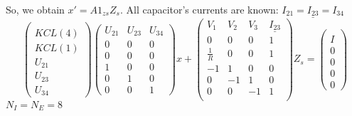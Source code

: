  So, we obtain $x'=A1_{zs}Z_{s}$. All capacitor's currents are known:
 $I_{21}=\underline{I_{23}}=I_{34}$\\
\[\left(\begin{array}{c}
  \\
KCL(4)\\KCL(1)\\U_{21}\\U_{23}\\U_{34}
\end{array}\right)
\left(\begin{array}{ccc}
  U_{21}&U_{23}&U_{34}\\
  \hline
  0&0&0\\
  0&0&0\\
  1&0&0\\
  0&1&0\\
  0&0&1
\end{array}\right)x+
\left(\begin{array}{cccc}
  V_{1}&V_{2}&V_{3}&\underline{I_{23}}\\
  \hline
  0&0&0&1\\
  \frac{1}{R}&0&0&1\\
  -1&1&0&0\\
  0&-1&1&0\\
  0&0&-1&1\\
\end{array}\right)Z_{s}=
\left(\begin{array}{c}
\\I\\0\\0\\0\\0
\end{array}\right)
\]
 $N_{I}=N_{E}=8$\\
